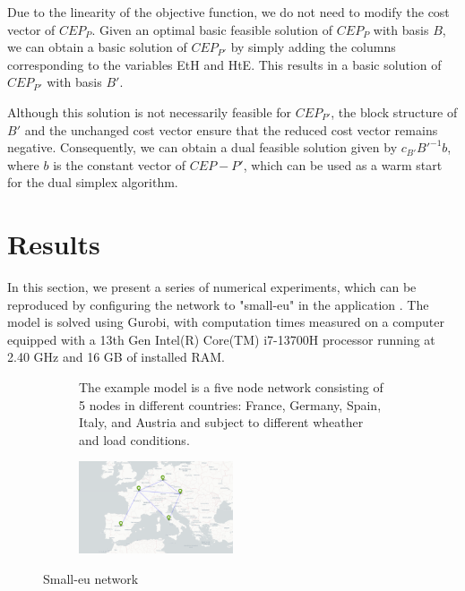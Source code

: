 \documentclass[english]{article}
\numberwithin{definition}{section}
\numberwithin{theorem}{section}
\numberwithin{problem}{section}
\begin{document}
Due to the linearity of the objective function, we do not need to modify the cost vector of \(CEP_P\). Given an optimal basic feasible solution of \(CEP_P\) with basis \(B\), we can obtain a basic solution of \(CEP_{P'}\) by simply adding the columns corresponding to the variables EtH and HtE. This results in a basic solution of \(CEP_{P'}\) with basis \(B'\).

Although this solution is not necessarily feasible for \(CEP_{P'}\), the block structure of \(B'\) and the unchanged cost vector ensure that the reduced cost vector remains negative. Consequently, we can obtain a dual feasible solution given by \(c_{B'} B'^{-1} b\), where \(b\) is the constant vector of \(CEP-P'\), which can be used as a warm start for the dual simplex algorithm.

\section{Results}


In this section, we present a series of numerical experiments, which can be reproduced by configuring the network to "small-eu" in the application \cite{MOPTA}. The model is solved using Gurobi, with computation times measured on a computer equipped with a 13th Gen Intel(R) Core(TM) i7-13700H processor running at 2.40 GHz and 16 GB of installed RAM.
\begin{figure}[H]
\begin{subfigure}{0.5\textwidth}

\vspace{-10pt}

  The example model is a five node network consisting of 5 nodes in different countries: France, Germany, Spain, Italy, and Austria and subject to different wheather and load conditions.

\end{subfigure}
\begin{subfigure}{0.5\textwidth}
\centering
\vspace{-10pt}
\includegraphics*[width=0.5\textwidth]{immagini/small-eu-network.png}
\end{subfigure}
\caption{Small-eu network}
\label{fig:small eu network}
\end{figure}
\end{document}

